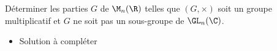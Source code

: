 \begin{enonce}
\begin{exercise}[ID={RMS134 E570},subtitle={Oral
    Mines-Ponts},theme={algebre},annee={2023},concours={mines-ponts},filiere={MP}, difficulty={0}]
Déterminer les parties $G$ de $\M_n(\R)$ telles que $(G,\times)$ soit
un groupe multiplicatif et $G$ ne soit pas un sous-groupe de $\GL_n(\C)$.
\end{exercise}
\begin{solution}
  \begin{itemize}
  \item Solution à compléter
  \end{itemize}
\end{solution}
\end{enonce}